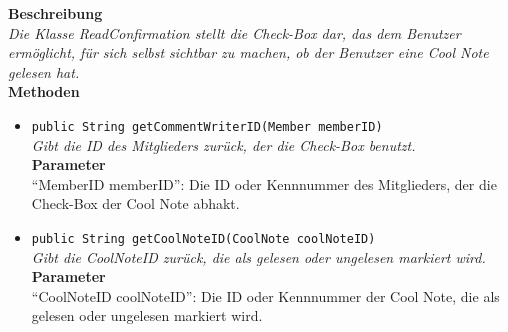 	\textbf{Beschreibung} \\
	\textit{Die Klasse ReadConfirmation stellt die Check-Box dar, das dem Benutzer ermöglicht, für sich selbst sichtbar zu machen, ob der Benutzer eine Cool Note gelesen hat.} \\
	
	\textbf{Methoden}
	\begin{itemize}
		\item\texttt{{public String getCommentWriterID(Member memberID)}}\\
		\textit{Gibt die ID des Mitglieders zurück, der die Check-Box benutzt.}\\
		\textbf{Parameter}\\
		“MemberID memberID”: Die ID oder Kennnummer des Mitglieders, der die Check-Box der Cool Note abhakt.\\
		
		\item\texttt{{public String getCoolNoteID(CoolNote coolNoteID)}}\\
		\textit{Gibt die CoolNoteID zurück, die als gelesen oder ungelesen markiert wird.}\\
		\textbf{Parameter}\\
		“CoolNoteID coolNoteID”: Die ID oder Kennnummer der Cool Note, die als gelesen oder ungelesen markiert wird.\\
	\end{itemize}
